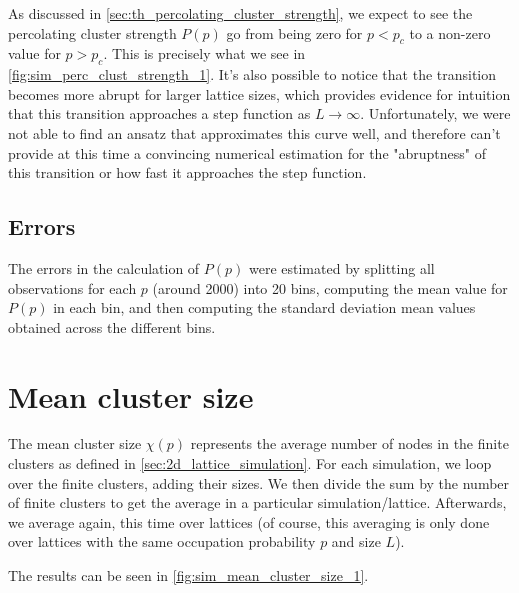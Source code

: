 As discussed in \autoref{sec:th_percolating_cluster_strength}, we expect to see the percolating cluster strength $P(p)$ go from being zero for $p < p_c$ to a non-zero value for $p > p_c$. This is precisely what we see in \autoref{fig:sim_perc_clust_strength_1}. It's also possible to notice that the transition becomes more abrupt for larger lattice sizes, which provides evidence for intuition that this transition approaches a step function as $L \to \infty$.
Unfortunately, we were not able to find an ansatz that approximates this curve well, and therefore can't provide at this time a convincing numerical estimation for the "abruptness" of this transition or how fast it approaches the step function. 


\subsection{Errors}
\label{sec:error_perc_strength}

The errors in the calculation of $P(p)$ were estimated by splitting all observations for each $p$ (around 2000) into 20 bins, computing the mean value for $P(p)$ in each bin, and then computing the standard deviation mean values obtained across the different bins.


\section{Mean cluster size}

The mean cluster size $\chi(p)$ represents the average number of nodes in the finite clusters as defined in \autoref{sec:2d_lattice_simulation}. For each simulation, we loop over the finite clusters, adding their sizes. We then divide the sum by the number of finite clusters to get the average in a particular simulation/lattice. Afterwards, we average again, this time over lattices (of course, this averaging is only done over lattices with the same occupation probability $p$ and size $L$). 


The results can be seen in \autoref{fig:sim_mean_cluster_size_1}.



